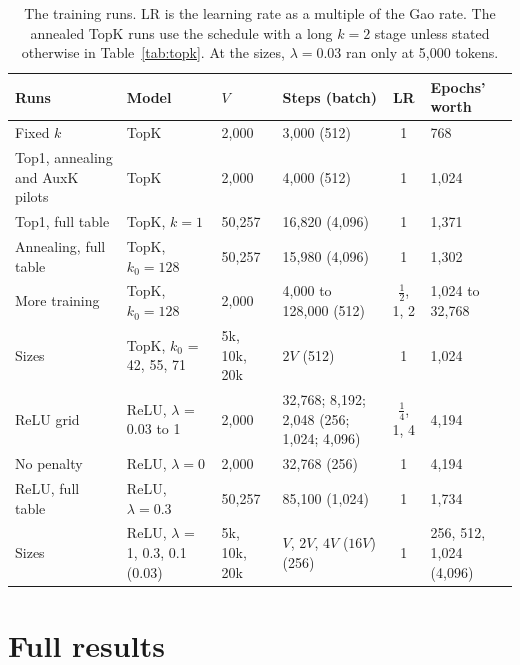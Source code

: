 \documentclass[11pt]{article}
\begin{document}
\begin{table}[h]
\centering
\small
\begin{tabular}{@{}L{2.7cm}L{2.9cm}L{1.6cm}L{2.9cm}cL{1.9cm}@{}}
\toprule
Runs & Model & $V$ & Steps (batch) & LR & Epochs' worth \\
\midrule
Fixed $k$ & TopK & 2,000 & 3,000 (512) & 1 & 768 \\
Top1, annealing and AuxK pilots & TopK & 2,000 & 4,000 (512) & 1 & 1,024 \\
Top1, full table & TopK, $k = 1$ & 50,257 & 16,820 (4,096) & 1 & 1,371 \\
Annealing, full table & TopK, $k_0 = 128$ & 50,257 & 15,980 (4,096) & 1 & 1,302 \\
More training & TopK, $k_0 = 128$ & 2,000 & 4,000 to 128,000 (512) & $\tfrac12$, 1, 2 & 1,024 to 32,768 \\
Sizes & TopK, $k_0$ = 42, 55, 71 & 5k, 10k, 20k & $2V$ (512) & 1 & 1,024 \\
ReLU grid & ReLU, $\lambda$ = 0.03 to 1 & 2,000 & 32,768; 8,192; 2,048 (256; 1,024; 4,096) & $\tfrac14$, 1, 4 & 4,194 \\
No penalty & ReLU, $\lambda = 0$ & 2,000 & 32,768 (256) & 1 & 4,194 \\
ReLU, full table & ReLU, $\lambda = 0.3$ & 50,257 & 85,100 (1,024) & 1 & 1,734 \\
Sizes & ReLU, $\lambda$ = 1, 0.3, 0.1 (0.03) & 5k, 10k, 20k & $V$, $2V$, $4V$ ($16V$) (256) & 1 & 256, 512, 1,024 (4,096) \\
\bottomrule
\end{tabular}
\caption{The training runs. LR is the learning rate as a multiple of the Gao rate. The annealed TopK runs use the schedule with a long $k = 2$ stage unless stated otherwise in Table~\ref{tab:topk}. At the sizes, $\lambda = 0.03$ ran only at 5,000 tokens.}
\label{tab:runs}
\end{table}

\clearpage
\section{Full results}
\label{app:results}
\end{document}
